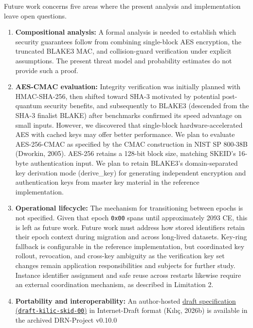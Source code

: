 \documentclass[fleqn,10pt,lineno]{wlpeerj}
\begin{document}
Future work concerns five areas where the present analysis and
implementation leave open questions.

\begin{enumerate}
\def\labelenumi{\arabic{enumi}.}
\item
  \textbf{Compositional analysis:} A formal analysis is needed to
  establish which security guarantees follow from combining single-block
  AES encryption, the truncated BLAKE3 MAC, and collision-guard
  verification under explicit assumptions. The present threat model and
  probability estimates do not provide such a proof.
\item
  \textbf{AES-CMAC evaluation:} Integrity verification was initially
  planned with HMAC-SHA-256, then shifted toward SHA-3 motivated by
  potential post-quantum security benefits, and subsequently to BLAKE3
  (descended from the SHA-3 finalist BLAKE) after benchmarks confirmed
  its speed advantage on small inputs. However, we discovered that
  single-block hardware-accelerated AES with cached keys may offer
  better performance. We plan to evaluate AES-256-CMAC as specified by
  the CMAC construction in NIST SP 800-38B (Dworkin, 2005). AES-256
  retains a 128-bit block size, matching SKEID's 16-byte authentication
  input. We plan to retain BLAKE3's domain-separated key derivation mode
  (derive\_key) for generating independent encryption and authentication
  keys from master key material in the reference implementation.
\item
  \textbf{Operational lifecycle:} The mechanism for transitioning
  between epochs is not specified. Given that epoch \texttt{0x00} spans
  until approximately 2093 CE, this is left as future work. Future work
  must address how stored identifiers retain their epoch context during
  migration and across long-lived datasets. Key-ring fallback is
  configurable in the reference implementation, but coordinated key
  rollout, revocation, and cross-key ambiguity as the verification key
  set changes remain application responsibilities and subjects for
  further study. Instance identifier assignment and safe reuse across
  restarts likewise require an external coordination mechanism, as
  described in Limitation 2.
\item
  \textbf{Portability and interoperability:} An author-hosted
  \href{https://github.com/duranserkan/DRN-Project/blob/release/v0.10.0/docs/draft-skid-00.md}{draft
  specification (\texttt{draft-kilic-skid-00})} in Internet-Draft format
  (Kılıç, 2026b) is available in the archived DRN-Project v0.10.0

\end{enumerate}
\end{document}
